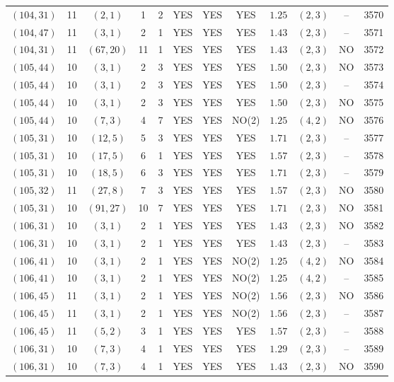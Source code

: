 \begin{longtable}{|c|c|c|c|c|c|c|c|c|c|c|c|}
$(104,31)$ & 11 & $(2,1)$ & 1 & 2 & YES & YES & YES & $1.25$ & $(2,3)$ & -- & 3570\\
$(104,47)$ & 11 & $(3,1)$ & 2 & 1 & YES & YES & YES & $1.43$ & $(2,3)$ & -- & 3571\\
$(104,31)$ & 11 & $(67,20)$ & 11 & 1 & YES & YES & YES & $1.43$ & $(2,3)$ & NO & 3572\\
$(105,44)$ & 10 & $(3,1)$ & 2 & 3 & YES & YES & YES & $1.50$ & $(2,3)$ & NO & 3573\\
$(105,44)$ & 10 & $(3,1)$ & 2 & 3 & YES & YES & YES & $1.50$ & $(2,3)$ & -- & 3574\\
$(105,44)$ & 10 & $(3,1)$ & 2 & 3 & YES & YES & YES & $1.50$ & $(2,3)$ & NO & 3575\\
$(105,44)$ & 10 & $(7,3)$ & 4 & 7 & YES & YES & NO(2) & $1.25$ & $(4,2)$ & NO & 3576\\
$(105,31)$ & 10 & $(12,5)$ & 5 & 3 & YES & YES & YES & $1.71$ & $(2,3)$ & -- & 3577\\
$(105,31)$ & 10 & $(17,5)$ & 6 & 1 & YES & YES & YES & $1.57$ & $(2,3)$ & -- & 3578\\
$(105,31)$ & 10 & $(18,5)$ & 6 & 3 & YES & YES & YES & $1.71$ & $(2,3)$ & -- & 3579\\
$(105,32)$ & 11 & $(27,8)$ & 7 & 3 & YES & YES & YES & $1.57$ & $(2,3)$ & NO & 3580\\
$(105,31)$ & 10 & $(91,27)$ & 10 & 7 & YES & YES & YES & $1.71$ & $(2,3)$ & NO & 3581\\
$(106,31)$ & 10 & $(3,1)$ & 2 & 1 & YES & YES & YES & $1.43$ & $(2,3)$ & NO & 3582\\
$(106,31)$ & 10 & $(3,1)$ & 2 & 1 & YES & YES & YES & $1.43$ & $(2,3)$ & -- & 3583\\
$(106,41)$ & 10 & $(3,1)$ & 2 & 1 & YES & YES & NO(2) & $1.25$ & $(4,2)$ & NO & 3584\\
$(106,41)$ & 10 & $(3,1)$ & 2 & 1 & YES & YES & NO(2) & $1.25$ & $(4,2)$ & -- & 3585\\
$(106,45)$ & 11 & $(3,1)$ & 2 & 1 & YES & YES & NO(2) & $1.56$ & $(2,3)$ & NO & 3586\\
$(106,45)$ & 11 & $(3,1)$ & 2 & 1 & YES & YES & NO(2) & $1.56$ & $(2,3)$ & -- & 3587\\
$(106,45)$ & 11 & $(5,2)$ & 3 & 1 & YES & YES & YES & $1.57$ & $(2,3)$ & -- & 3588\\
$(106,31)$ & 10 & $(7,3)$ & 4 & 1 & YES & YES & YES & $1.29$ & $(2,3)$ & -- & 3589\\
$(106,31)$ & 10 & $(7,3)$ & 4 & 1 & YES & YES & YES & $1.43$ & $(2,3)$ & NO & 3590\\

\end{longtable}
